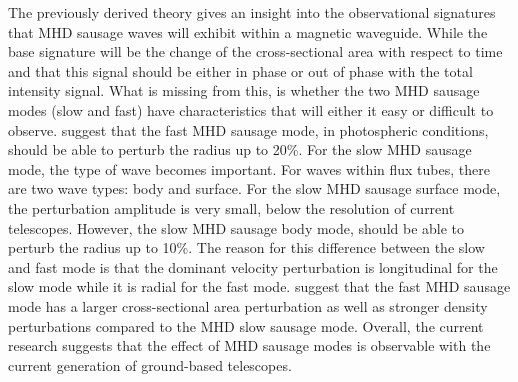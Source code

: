 	The previously derived theory \citep{Moreels2013,Moreels2013b,2015A&A...579A..73M,jess2015multiwavelength} gives an insight into the observational signatures that MHD sausage waves will exhibit within a magnetic waveguide.
	While the base signature will be the change of the cross-sectional area with respect to time and that this signal should be either in phase or out of phase with the total intensity signal. 
	What is missing from this, is whether the two MHD sausage modes (slow and fast) have characteristics that will either it easy or difficult to observe.
    \cite{Moreels2013} suggest that the fast MHD sausage mode, in photospheric conditions, should be able to perturb the radius up to 20\%.
    For the slow MHD sausage mode, the type of wave becomes important.
    For waves within flux tubes, there are two wave types: body and surface.
	For the slow MHD sausage surface mode, the perturbation amplitude is very small, below the resolution of current telescopes.
	However, the slow MHD sausage body mode, should be able to perturb the radius up to 10\%.
	The reason for this difference between the slow and fast mode is that the dominant velocity perturbation is longitudinal for the slow mode while it is radial for the fast mode.
    \cite{jess2015multiwavelength} suggest that the fast MHD sausage mode has a larger cross-sectional area perturbation as well as stronger density perturbations compared to the MHD slow sausage mode.
    Overall, the current research suggests that the effect of MHD sausage modes is observable with the current generation of ground-based telescopes.